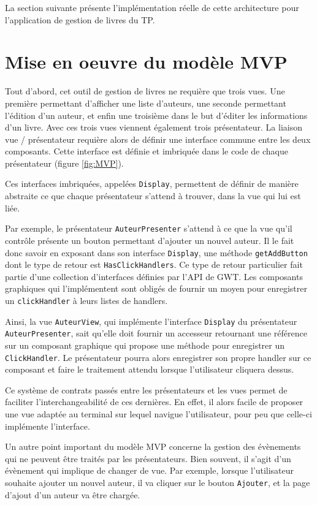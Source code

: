 La section suivante présente l'implémentation réelle de cette architecture pour l'application de gestion de livres du TP.

\section{Mise en oeuvre du modèle MVP}
Tout d'abord, cet outil de gestion de livres ne requière que trois vues. Une première permettant d'afficher une liste d'auteurs, une seconde permettant l'édition d'un auteur, et enfin une troisième dans le but d'éditer les informations d'un livre. Avec ces trois vues viennent également trois présentateur. La liaison vue / présentateur requière alors de définir une interface commune entre les deux composants. Cette interface est définie et imbriquée dans le code de chaque présentateur (figure \ref{fig:MVP}).


Ces interfaces imbriquées, appelées \verb|Display|, permettent de définir de manière abstraite ce que chaque présentateur s'attend à trouver, dans la vue qui lui est liée.

Par exemple, le présentateur \verb|AuteurPresenter| s'attend à ce que la vue qu'il contrôle présente un bouton permettant d'ajouter un nouvel auteur. Il le fait donc savoir en exposant dans son interface \verb|Display|, une méthode \verb|getAddButton| dont le type de retour est \verb|HasClickHandlers|. Ce type de retour particulier fait partie d'une collection d'interfaces définies par l'API de GWT. Les composants graphiques qui l'implémentent sont obligés de fournir un moyen pour enregistrer un \verb|clickHandler| à leurs listes de handlers.

Ainsi, la vue \verb|AuteurView|, qui implémente l'interface \verb|Display| du présentateur  \verb|AuteurPresenter|, sait qu'elle doit fournir un accesseur retournant une référence sur un composant graphique qui propose une méthode pour enregistrer un \verb|ClickHandler|. Le présentateur pourra alors enregistrer son propre handler sur ce composant et faire le traitement attendu lorsque l'utilisateur cliquera dessus.

Ce système de contrats passés entre les présentateurs et les vues permet de faciliter l'interchangeabilité de ces dernières. En effet, il alors facile de proposer une vue adaptée au terminal sur lequel navigue l'utilisateur, pour peu que celle-ci implémente l'interface.

Un autre point important du modèle MVP concerne la gestion des évènements qui ne peuvent être traités par les présentateurs. Bien souvent, il s'agit d'un évènement qui implique de changer de vue. Par exemple, lorsque l'utilisateur souhaite ajouter un nouvel auteur, il va cliquer sur le bouton \verb|Ajouter|, et la page d'ajout d'un auteur va être chargée.

